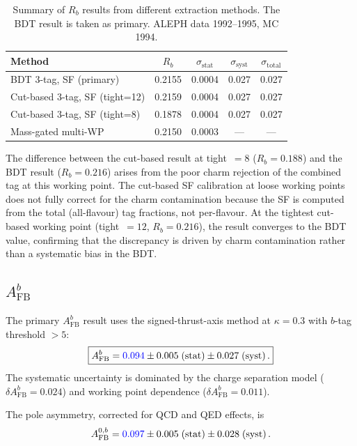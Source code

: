 \documentclass[11pt,a4paper]{article}
\newcommand{\measured}[1]{\textcolor{blue}{#1}}
\begin{document}
\begin{table}[htbp]
\centering
\caption{Summary of $R_b$ results from different extraction methods.
  The BDT result is taken as primary.  ALEPH data 1992--1995, MC 1994.}
\label{tbl:rb-results}
\begin{tabular}{lcccc}
\toprule
Method & $R_b$ & $\sigma_\mathrm{stat}$ & $\sigma_\mathrm{syst}$ & $\sigma_\mathrm{total}$ \\
\midrule
BDT 3-tag, SF (primary) & 0.2155 & 0.0004 & 0.027 & 0.027 \\
Cut-based 3-tag, SF (tight=12) & 0.2159 & 0.0004 & 0.027 & 0.027 \\
Cut-based 3-tag, SF (tight=8) & 0.1878 & 0.0004 & 0.027 & 0.027 \\
Mass-gated multi-WP & 0.2150 & 0.0003 & --- & --- \\
\bottomrule
\end{tabular}
\end{table}

The difference between the cut-based result at tight~$=8$ ($R_b = 0.188$)
and the BDT result ($R_b = 0.216$) arises from the poor charm rejection of
the combined tag at this working point.  The cut-based SF calibration at
loose working points does not fully correct for the charm contamination
because the SF is computed from the total (all-flavour) tag fractions, not
per-flavour.  At the tightest cut-based working point (tight~$=12$,
$R_b = 0.216$), the result converges to the BDT value, confirming that the
discrepancy is driven by charm contamination rather than a systematic bias
in the BDT.

\subsection{$A_\mathrm{FB}^b$}

The primary $A_\mathrm{FB}^b$ result uses the signed-thrust-axis method
at $\kappa = 0.3$ with $b$-tag threshold $> 5$:
\begin{equation}
\boxed{
  A_\mathrm{FB}^b = \measured{0.094} \pm 0.005\;\mathrm{(stat)} \pm
  0.027\;\mathrm{(syst)}\,.
}
\label{eq:afb-result}
\end{equation}
The systematic uncertainty is dominated by the charge separation model
($\delta A_\mathrm{FB}^b = 0.024$) and working point dependence
($\delta A_\mathrm{FB}^b = 0.011$).

The pole asymmetry, corrected for QCD and QED effects, is
\begin{equation}
  A_\mathrm{FB}^{0,b} = \measured{0.097} \pm 0.005\;\mathrm{(stat)}
    \pm 0.028\;\mathrm{(syst)}\,.
  \label{eq:afb0-result}
\end{equation}
\end{document}
